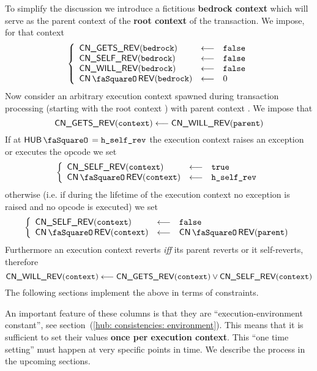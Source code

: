 To simplify the discussion we introduce a fictitious \textbf{bedrock context} \locBedrockContext{} which will serve as the parent context of the \textbf{root context} \locRootContext{} of the transaction.
We impose, for that context
\[
	\left\{ \begin{array}{lcl}
		\cnGetsRev  (\locBedrockContext) & \longleftarrow & \locFalse \\
		\cnSelfRev  (\locBedrockContext) & \longleftarrow & \locFalse \\
		\cnWillRev  (\locBedrockContext) & \longleftarrow & \locFalse \\
		\cnRevStamp (\locBedrockContext) & \longleftarrow & 0         \\
	\end{array} \right.
\]
Now consider an arbitrary execution context \locCurrentContext{} spawned during transaction processing (starting with the root context \locRootContext) with parent context \locParentContext{}.
We impose that
\[
	\textsf{CN}\textsf{\_GETS\_REV}(\texttt{context})  \longleftarrow  \textsf{CN}\textsf{\_WILL\_REV}(\texttt{parent})
\]
If at $\hubStamp = \locRevertStamp$ the execution context \locCurrentContext{} raises an exception or executes the  opcode we set
\[
	\left\{ \begin{array}{lcl}
		\cnSelfRev  (\locCurrentContext) & \longleftarrow & \locTrue         \\
		\cnRevStamp (\locCurrentContext) & \longleftarrow & \locRevertStamp \\
	\end{array} \right.
\]
otherwise (i.e. if during the lifetime of the execution context \locCurrentContext{} no exception is raised and no  opcode is executed) we set 
\[
	\left\{ \begin{array}{lcl}
		\cnSelfRev  (\locCurrentContext) & \longleftarrow & \locFalse                 \\
		\cnRevStamp (\locCurrentContext) & \longleftarrow & \cnRevStamp(\locParentContext) \\
	\end{array} \right.
\]
Furthermore an execution context \locCurrentContext{} reverts \emph{iff} its parent reverts or it self-reverts, therefore
\[
	\textsf{CN}\textsf{\_WILL\_REV}(\texttt{context}) \longleftarrow \textsf{CN}\textsf{\_GETS\_REV}(\texttt{context}) \vee \textsf{CN}\textsf{\_SELF\_REV}(\texttt{context})
\]
The following sections implement the above in terms of constraints.

\saNote{}
An important feature of these columns is that they are ``execution-environment constant'', see section~(\ref{hub: consistencies: environment}).
This means that it is sufficient to set their values \textbf{once per execution context}.
This ``one time setting'' must happen at very specific points in time.
We describe the process in the upcoming sections.
